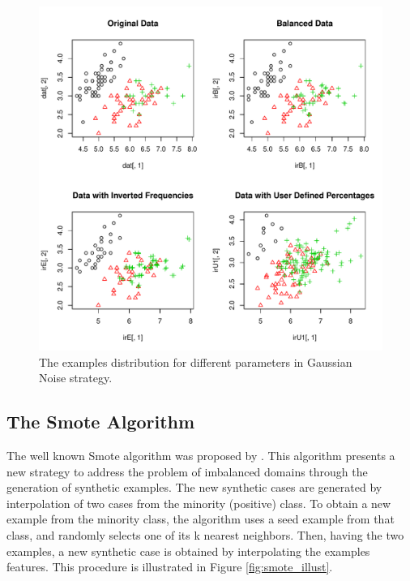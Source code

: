\documentclass[10pt,a4paper]{article}\usepackage[]{graphicx}\usepackage[]{color}
\makeatletter
\def\maxwidth{ %
  \ifdim\Gin@nat@width>\linewidth
    \linewidth
  \else
    \Gin@nat@width
  \fi
}
\newenvironment{knitrout}{}{} %
\makeatother
\begin{document}
\begin{knitrout}\footnotesize
{}\color{fgcolor}\begin{figure}

{\centering \includegraphics[width=\maxwidth]{figures/UBL-ir_GN_plot2-1} 

}

\caption[The examples distribution for different parameters in Gaussian Noise strategy]{The examples distribution for different parameters in Gaussian Noise strategy.}\label{fig:ir_GN_plot2}
\end{figure}


\end{knitrout}

\subsection{The Smote Algorithm}\label{sec:smoteClassif}

The well known Smote algorithm was proposed by \cite{CBOK02}. This algorithm presents a new strategy to address the problem of imbalanced domains through the generation of synthetic examples. The new synthetic cases are generated by interpolation of two cases from the minority (positive) class. To obtain a new example from the minority class, the algorithm uses a seed example from that class, and randomly selects one of its k nearest neighbors. Then, having the two examples, a new synthetic case is obtained by interpolating the examples features. This procedure is illustrated in Figure \ref{fig:smote_illust}.
\end{document}
